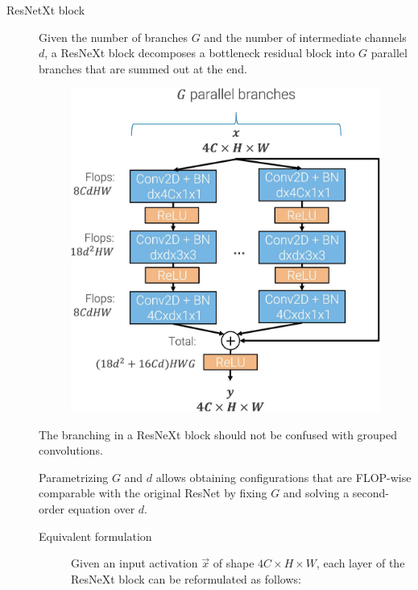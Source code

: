 \begin{description}
    \item[ResNetXt block] 
        Given the number of branches $G$ and the number of intermediate channels $d$, a ResNeXt block decomposes a bottleneck residual block into $G$ parallel branches that are summed out at the end.
        \begin{figure}[H]
            \centering
            \includegraphics[width=0.35\linewidth]{./img/_resnext_block.jpg}
        \end{figure}

        \begin{remark}
            The branching in a ResNeXt block should not be confused with grouped convolutions.
        \end{remark}

        \begin{remark}
            Parametrizing $G$ and $d$ allows obtaining configurations that are FLOP-wise comparable with the original ResNet by fixing $G$ and solving a second-order equation over $d$.
        \end{remark}

        \begin{description}
            \item[Equivalent formulation]
                Given an input activation $\vec{x}$ of shape $4C \times H \times W$, each layer of the ResNeXt block can be reformulated as follows:
\end{description}
\end{description}
